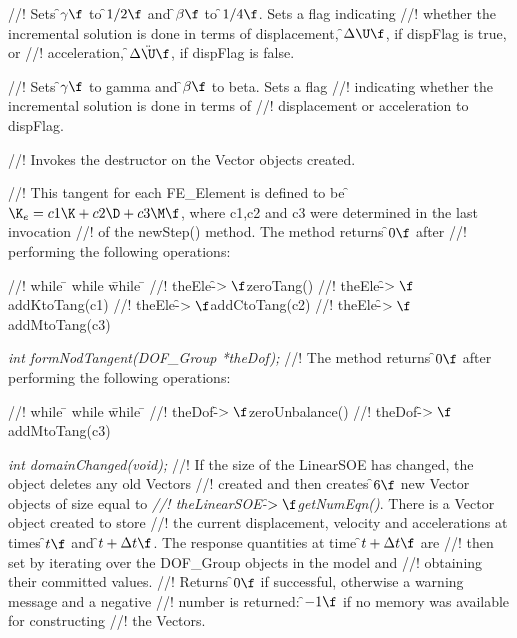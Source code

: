 //! Sets \f$\gamma\f$ to \f$1/2\f$ and \f$\beta\f$ to \f$1/4\f$. Sets a flag indicating
//! whether the incremental solution is done in terms of displacement,
\f$\Delta \U\f$, if \p dispFlag is \p true, or  
//! acceleration, \f$\Delta \ddot \U\f$, if \p dispFlag is \p false.

//! Sets \f$\gamma\f$ to \p gamma and \f$\beta\f$ to \p beta. Sets a flag
//! indicating whether the incremental solution is done in terms of
//! displacement or acceleration to \p dispFlag.

//! Invokes the destructor on the Vector objects created.

//! This tangent for each FE\_Element is defined to be \f$\K_e = c1 \K + c2
\D + c3 \M\f$, where c1,c2 and c3 were determined in the last invocation
//! of the newStep() method.  The method returns \f$0\f$ after
//! performing the following operations:
\begin{tabbing}
//! while \= \+ while \= while \= \kill
//! theEle-\f$>\f$zeroTang()
//! theEle-\f$>\f$addKtoTang(c1)
//! theEle-\f$>\f$addCtoTang(c2)
//! theEle-\f$>\f$addMtoTang(c3) 
\end{tabbing}


{\em int formNodTangent(DOF\_Group *theDof);}
//! The method returns \f$0\f$ after performing the following operations:
\begin{tabbing}
//! while \= \+ while \= while \= \kill
//! theDof-\f$>\f$zeroUnbalance()
//! theDof-\f$>\f$addMtoTang(c3) 
\end{tabbing}


{\em int domainChanged(void);}
//! If the size of the LinearSOE has changed, the object deletes any old Vectors
//! created and then creates \f$6\f$ new Vector objects of size equal to {\em
//! theLinearSOE-\f$>\f$getNumEqn()}. There is a Vector object created to store
//! the current displacement, velocity and accelerations at times \f$t\f$ and
\f$t + \Delta t\f$. The response quantities at time \f$t + \Delta t\f$ are
//! then set by iterating over the DOF\_Group objects in the model and
//! obtaining their committed values. 
//! Returns \f$0\f$ if successful, otherwise a warning message and a negative
//! number is returned: \f$-1\f$ if no memory was available for constructing
//! the Vectors.

